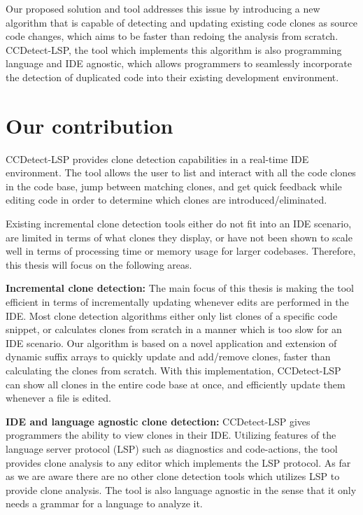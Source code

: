 Our proposed solution and tool addresses this issue by introducing a new algorithm that is
capable of detecting and updating existing code clones as source code changes, which aims
to be faster than redoing the analysis from scratch. CCDetect-LSP, the tool which
implements this algorithm is also programming language and IDE agnostic, which allows
programmers to seamlessly incorporate the detection of duplicated code into their existing
development environment.

\section{Our contribution}

CCDetect-LSP provides clone detection capabilities in a real-time IDE environment. The
tool allows the user to list and interact with all the code clones in the code base, jump
between matching clones, and get quick feedback while editing code in order to determine
which clones are introduced/eliminated.

Existing incremental clone detection tools either do not fit into an IDE scenario, are
limited in terms of what clones they display, or have not been shown to scale well in
terms of processing time or memory usage for larger codebases. Therefore, this thesis will
focus on the following areas.

\textbf{Incremental clone detection:} The main focus of this thesis is making the tool
efficient in terms of incrementally updating whenever edits are performed in the IDE. Most
clone detection algorithms either only list clones of a specific code snippet, or
calculates clones from scratch in a manner which is too slow for an IDE scenario. Our
algorithm is based on a novel application and extension of dynamic suffix arrays to
quickly update and add/remove clones, faster than calculating the clones from scratch.
With this implementation, CCDetect-LSP can show all clones in the entire code base at
once, and efficiently update them whenever a file is edited.

\textbf{IDE and language agnostic clone detection:} CCDetect-LSP gives programmers the
ability to view clones in their IDE. Utilizing features of the language server protocol
(LSP) such as diagnostics and code-actions, the tool provides clone analysis to any editor
which implements the LSP protocol. As far as we are aware there are no other clone
detection tools which utilizes LSP to provide clone analysis. The tool is also language
agnostic in the sense that it only needs a grammar for a language to analyze it.

